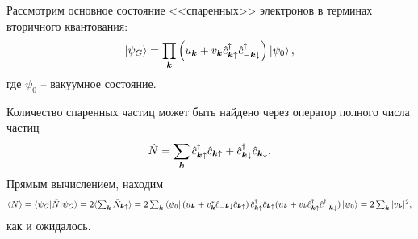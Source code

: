

Рассмотрим основное состояние <<спаренных>> электронов в терминах вторичного квантования:
\begin{equation}
	\left| \psi_G \right\rangle = \prod_{{\boldsymbol{k}}} \left(
		u_{{\boldsymbol{k}}} + v_{{\boldsymbol{k}}} \hat{c}^{\dag}_{{\boldsymbol{k}} \uparrow} \hat{c}^{\dag}_{-{\boldsymbol{k}}\downarrow}
	\right) \left| \psi_0 \right\rangle,
	\label{GroundBCS}
\end{equation}
где $\psi_0$ -- вакуумное состояние. 

Количество спаренных частиц может быть найдено через оператор полного числа частиц
\begin{equation*}
	\hat{N} = \sum_{{\boldsymbol{k}}}  \hat{c}^{\dag}_{{\boldsymbol{k}} \uparrow} \hat{c}_{{\boldsymbol{k}} \uparrow} + \hat{c}^{\dag}_{{\boldsymbol{k}} \downarrow} \hat{c}_{{\boldsymbol{k}} \downarrow}.
\end{equation*}
Прямым вычислением, находим
\begin{equation*}
	\langle N\rangle = \bk{\psi_G}[\hat{N}]{\psi_G} = 2 \langle \textstyle\sum_{\vc{k}} \hat{N}_{\vc{k} \up} \rangle 
	= 2 \sum_{\vc{k}} \bra{\psi_0}
	 \left(
		u_\vc{k} + v_{\vc{k}}^* \hat{c}_{-\vc{k}\down} \hat{c}_{\vc{k} \up}
	\right)
	\hat{c}_{\vc{k} \up}\D \hat{c}_{\vc{k} \up} 
	(
		u_k + v_k \hat{c}\D_{\vc{k} \up} \hat{c}_{-\vc{k}\down}\D
	) \ket{\psi_0} = 2 \sum_{\vc{k}} |v_{\vc{k}}|^2,
\end{equation*}
как и ожидалось. 







